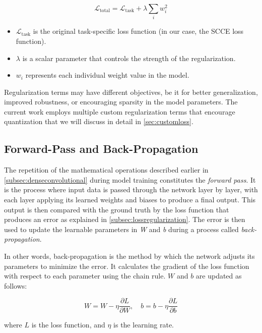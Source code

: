 \[
\mathcal{L}_{\text{total}} = \mathcal{L}_{\text{task}} + \lambda \sum_{i} w_i^2
\]

\begin{itemize}
  \item \( \mathcal{L}_{\text{task}} \) is the original task-specific loss function (in our case, the SCCE loss function).
  \item \( \lambda \) is a scalar parameter that controls the strength of the regularization.
  \item \( w_i \) represents each individual weight value in the model.
\end{itemize}

Regularization terms may have different objectives, be it for better generalization, 
improved robustness, or encouraging sparsity in the model parameters. 
The current work employs multiple custom regularization terms 
that encourage quantization that we will discuss in detail in \cref{sec:customloss}.


\subsection{Forward-Pass and Back-Propagation}
\label{subsec:forwardback}
\hspace*{1em} The repetition of the mathematical operations described earlier in \cref{subsec:denseconvolutional} 
during model training constitutes the \textit{forward pass}. 
It is the process where input data is passed through the network layer by layer, 
with each layer applying its learned weights and biases to produce a final output. 
This output is then compared with the ground truth by the loss function that produces an error
as explained in \cref{subsec:lossregularization}.
The error is then used to update the learnable parameters in \textit{W} and \textit{b} during a process called \textit{back-propagation}.

In other words, back-propagation is the method by which the network adjusts its parameters to minimize the error. 
It calculates the gradient of the loss function with respect to each parameter using the chain rule. 
\( W \) and \( b \) are updated as follows:

\[
W = W - \eta \frac{\partial L}{\partial W}, \quad b = b - \eta \frac{\partial L}{\partial b}
\]

where \( L \) is the loss function, and \( \eta \) is the learning rate.

